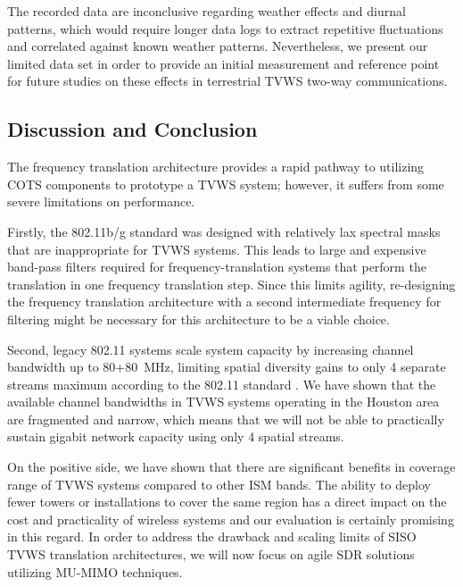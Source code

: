 	The recorded data are inconclusive regarding weather effects and diurnal patterns, which would require longer data logs to extract repetitive fluctuations and correlated against known weather patterns.
	Nevertheless, we present our limited data set in order to provide an initial measurement and reference point for future studies on these effects in terrestrial \ac{TVWS} two-way communications.
	

\subsection{Discussion and Conclusion}
\label{sec_siso_conclusion}

	The frequency translation architecture provides a rapid pathway to utilizing \ac{COTS} components to prototype a \ac{TVWS} system; however, it suffers from some severe limitations on performance.

	Firstly, the 802.11b/g standard was designed with relatively lax spectral masks that are inappropriate for \ac{TVWS} systems.
	This leads to large and expensive band-pass filters required for frequency-translation systems that perform the translation in one frequency translation step.
	Since this limits agility, re-designing the frequency translation architecture with a second intermediate frequency for filtering might be necessary for this architecture to be a viable choice.
	
	Second, legacy 802.11 systems scale system capacity by increasing channel bandwidth up to 80+80~MHz, limiting spatial diversity gains to only 4 separate streams maximum according to the 802.11 standard \cite{bejarano2013tutorial}.
	We have shown that the available channel bandwidths in \ac{TVWS} systems operating in the Houston area are fragmented and narrow, which means that we will not be able to practically sustain gigabit network capacity using only 4 spatial streams.
	
	On the positive side, we have shown that there are significant benefits in coverage range of \ac{TVWS} systems compared to other \ac{ISM} bands.
	The ability to deploy fewer towers or installations to cover the same region has a direct impact on the cost and practicality of wireless systems and our evaluation is certainly promising in this regard.
	In order to address the drawback and scaling limits of \ac{SISO} \ac{TVWS} translation architectures, we will now focus on agile \ac{SDR} solutions utilizing \ac{MU-MIMO} techniques.

